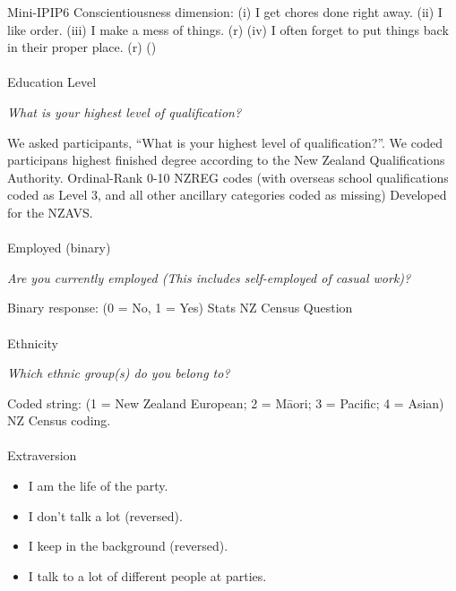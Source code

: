 \documentclass[
  single column]{article}
\makeatletter
\let\oldparagraph\paragraph
\renewcommand{\paragraph}{
    \@ifstar
      \xxxParagraphStar
      \xxxParagraphNoStar
  }
\newcommand{\xxxParagraphStar}[1]{\oldparagraph*{#1}\mbox{}}
\newcommand{\xxxParagraphNoStar}[1]{\oldparagraph{#1}\mbox{}}
\providecommand{\tightlist}{%
  \setlength{\itemsep}{0pt}\setlength{\parskip}{0pt}}\usepackage{longtable,booktabs,array}
\makeatother
\begin{document}
Mini-IPIP6 Conscientiousness dimension: (i) I get chores done right
away. (ii) I like order. (iii) I make a mess of things. (r) (iv) I often
forget to put things back in their proper place. (r)
()

\paragraph{Education Level}\label{education-level}

\emph{What is your highest level of qualification?}

We asked participants, ``What is your highest level of qualification?''.
We coded participans highest finished degree according to the New
Zealand Qualifications Authority. Ordinal-Rank 0-10 NZREG codes (with
overseas school qualifications coded as Level 3, and all other ancillary
categories coded as missing) Developed for the NZAVS.

\paragraph{Employed (binary)}\label{employed-binary}

\emph{Are you currently employed (This includes self-employed of casual
work)?}

Binary response: (0 = No, 1 = Yes) Stats NZ Census Question

\paragraph{Ethnicity}\label{ethnicity}

\emph{Which ethnic group(s) do you belong to?}

Coded string: (1 = New Zealand European; 2 = Māori; 3 = Pacific; 4 =
Asian) NZ Census coding.

\paragraph{Extraversion}\label{extraversion}

\begin{itemize}
\tightlist
\item
  I am the life of the party.
\item
  I don't talk a lot (reversed).
\item
  I keep in the background (reversed).
\item
  I talk to a lot of different people at parties.
\end{itemize}
\end{document}
